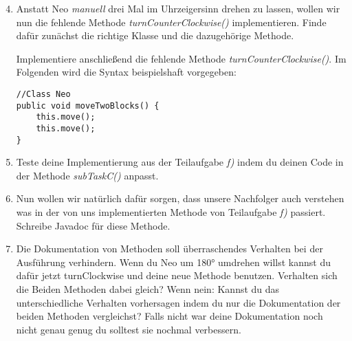 \begin{enumerate}[label=\alph*)] \setcounter{enumi}{3}
    \item Anstatt Neo \textit{manuell} drei Mal im Uhrzeigersinn drehen zu lassen, wollen wir nun die fehlende Methode \textit{turnCounterClockwise()}
    implementieren. Finde dafür zunächst die richtige Klasse und die dazugehörige Methode. \par
    Implementiere anschließend die fehlende Methode \textit{turnCounterClockwise()}. Im Folgenden wird die Syntax beispielshaft vorgegeben:
    \begin{lstlisting}
//Class Neo
public void moveTwoBlocks() {
    this.move();
    this.move();
}
    \end{lstlisting}
    \item Teste deine Implementierung aus der Teilaufgabe \textit{f)} indem du deinen Code in der Methode \textit{subTaskC()} anpasst.
    \item Nun wollen wir natürlich dafür sorgen, dass unsere Nachfolger auch verstehen was in der von uns implementierten Methode von 
    Teilaufgabe \textit{f)} passiert. Schreibe Javadoc für diese Methode.
    \item Die Dokumentation von Methoden soll überraschendes Verhalten bei der Ausführung verhindern. 
    Wenn du Neo um 180° umdrehen willst kannst du dafür jetzt turnClockwise und deine neue Methode benutzen. 
    Verhalten sich die Beiden Methoden dabei gleich?
    Wenn nein: Kannst du das unterschiedliche Verhalten vorhersagen indem du nur die Dokumentation der beiden Methoden vergleichst?
    Falls nicht war deine Dokumentation noch nicht genau genug du solltest sie nochmal verbessern.
\end{enumerate}
